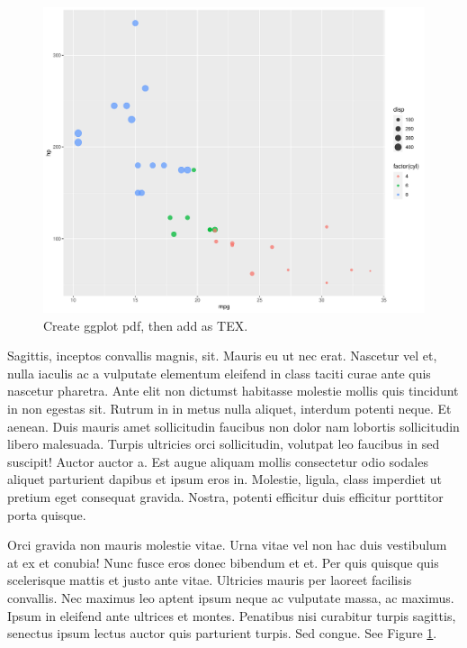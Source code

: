 \documentclass[
  9pt,
  letterpaper,
  DIV=11,
  numbers=noendperiod]{scrartcl}
\begin{document}
\begin{figure}
  \centering
  \includegraphics{mtcars.pdf}
  \caption{\label{fig-mtcars-wrapfig-0}Create ggplot pdf, then add as TEX.}
\end{figure}

Sagittis, inceptos convallis magnis, sit. Mauris eu ut nec erat.
Nascetur vel et, nulla iaculis ac a vulputate elementum eleifend in
class taciti curae ante quis nascetur pharetra. Ante elit non dictumst
habitasse molestie mollis quis tincidunt in non egestas sit. Rutrum in
in metus nulla aliquet, interdum potenti neque. Et aenean. Duis mauris
amet sollicitudin faucibus non dolor nam lobortis sollicitudin libero
malesuada. Turpis ultricies orci sollicitudin, volutpat leo faucibus in
sed suscipit! Auctor auctor a. Est augue aliquam mollis consectetur odio
sodales aliquet parturient dapibus et ipsum eros in. Molestie, ligula,
class imperdiet ut pretium eget consequat gravida. Nostra, potenti
efficitur duis efficitur porttitor porta quisque.

Orci gravida non mauris molestie vitae. Urna vitae vel non hac duis
vestibulum at ex et conubia! Nunc fusce eros donec bibendum et et. Per
quis quisque quis scelerisque mattis et justo ante vitae. Ultricies
mauris per laoreet facilisis convallis. Nec maximus leo aptent ipsum
neque ac vulputate massa, ac maximus. Ipsum in eleifend ante ultrices et
montes. Penatibus nisi curabitur turpis sagittis, senectus ipsum lectus
auctor quis parturient turpis. Sed congue. See Figure
\ref{fig-mtcars-wrapfig-0}.
\end{document}
